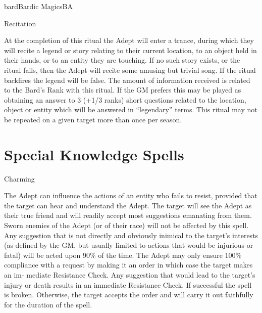 \begin{College}[2.1]{bard}{Bardic Magics}{BA}
\begin{ritual}[Q-2]{Recitation}

\begin{effects}
At the completion of this ritual the Adept will enter a trance, during
which they will recite a legend or story relating to their current
location, to an object held in their hands, or to an entity they are
touching.  If no such story exists, or the ritual fails, then the
Adept will recite some amusing but trivial song.  If the ritual
backfires the legend will be false.  The amount of information
received is related to the Bard’s Rank with this ritual.  If the GM
prefers this may be played as obtaining an answer to 3 (+1/3 ranks)
short questions related to the location, object or entity which will
be answered in “legendary” terms.  This ritual may not be repeated on
a given target more than once per season.
\end{effects}
\end{ritual}


\section{Special Knowledge Spells}

\begin{spell}[S-1]{Charming}

\begin{effects}
The Adept can influence the actions of an entity who fails to resist,
provided that the target can hear and understand the Adept. The target
will see the Adept as their true friend and will readily accept most
suggestions emanating from them.  Sworn enemies of the Adept (or of
their race) will not be affected by this spell. Any suggestion that is
not directly and obviously inimical to the target’s interests (as
defined by the GM, but usually limited to actions that would be
injurious or fatal) will be acted upon 90\% of the time.  The Adept
may only ensure 100\% compliance with a request by making it an order
in which case the target makes an im- mediate Resistance Check.  Any
suggestion that would lead to the target’s injury or death results in
an immediate Resistance Check.  If successful the spell is broken.
Otherwise, the target accepts the order and will carry it out
faithfully for the duration of the spell.
\end{effects}
\end{spell}


\end{College}
